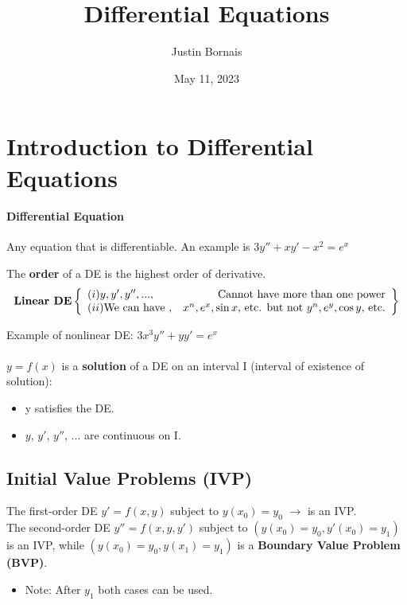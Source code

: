 \documentclass{article}
\title{Differential Equations}
\author{Justin Bornais}
\date{May 11, 2023}
\begin{document}
\maketitle
\section{Introduction to Differential Equations}
\paragraph{Differential Equation} Any equation that is differentiable. An example is $3y''+xy'-x^2=e^x$

The \textbf{order} of a DE is the highest order of derivative.
\begin{equation}
    \textbf{Linear DE}
    \left\{
        \begin{array}{lr}
            (i) y, y', y'', ..., & \text{Cannot have more than one power} \\
            (ii) $\text{We can have }$, & x^n, e^x, \sin{x},$\text{ etc. but not }$ y^n, e^y, \cos{y},$\text{ etc.}$
        \end{array}
    \right\}
\end{equation}

Example of nonlinear DE: $3x^3y'' + yy' = e^x$ \\ \\
$y=f(x)$ is a \textbf{solution} of a DE on an interval I (interval of existence of solution):
\begin{itemize}
    \itemsep 0em
    \item y satisfies the DE.
    \item $y$, $y'$, $y''$, ... are continuous on I.
\end{itemize}

\subsection{Initial Value Problems (IVP)}
The first-order DE $y'=f(x,y)$ subject to $y(x_0)=y_0$ $\rightarrow$ is an IVP. \\
The second-order DE $y''=f(x,y,y')$ subject to $\left(y(x_0)=y_0, y'(x_0)=y_1\right)$ is an IVP, while $\left(y(x_0)=y_0, y(x_1)=y_1\right)$ is a \textbf{Boundary Value Problem (BVP)}.
\begin{itemize}
    \itemsep 0em
    \item Note: After $y_1$ both cases can be used.
\end{itemize}
\end{document}
